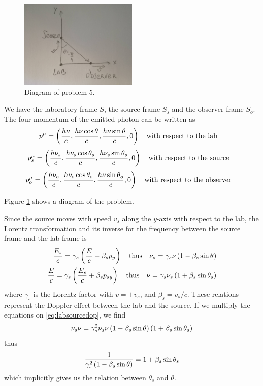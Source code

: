 \documentclass[oneside, 10pt, notitlepage]{book}
\begin{document}
\begin{figure}[H]
    \label{fig:L13_5}
    \centering
    \includegraphics[width=0.5\textwidth]{L13_5}
    \caption{Diagram of problem 5.}
\end{figure}  

We have the laboratory frame \(S\), the source frame \(S_s\) and the observer frame \(S_o\). The four-momentum of the emitted photon can be written as 
\begin{equation}
    p^{\mu} = \lr{\frac{h \nu}{c},\frac{h \nu\cos\theta}{c}, \frac{h \nu\sin\theta}{c},0 } \qq{with respect to the lab}
\end{equation}
\begin{equation}
    p_s^{\mu} = \lr{\frac{h \nu_s}{c},\frac{h \nu_s\cos\theta_s}{c}, \frac{h \nu_s\sin\theta_s}{c},0 }  \qq{with respect to the source}
\end{equation}
\begin{equation}
    p_o^{\mu} = \lr{\frac{h \nu_o}{c},\frac{h \nu_o\cos\theta_o}{c}, \frac{h \nu\sin\theta_o}{c},0 }  \qq{with respect to the observer}
\end{equation}

Figure \ref{fig:L13_5} shows a diagram of the problem.

Since the source moves with speed \(v_s\) along the \(y\)-axis with respect to the lab, the Lorentz transformation and its inverse for the frequency between the source frame and the lab frame is
\begin{equation}\label{eq:labsourcedop}
\begin{split}
    \frac{E_s}{c} = \gamma_s \lr{\frac{E}{c}-\beta_s p_y} \qq{thus} \nu_s = \gamma_s \nu \lr{1-\beta_s \sin \theta} \\
    \frac{E}{c} = \gamma_s \lr{\frac{E_s}{c}+\beta_s p_{sy}} \qq{thus} \nu = \gamma_s \nu_s \lr{1+\beta_s \sin \theta_s}
\end{split}
\end{equation}
where \(\gamma_s\) is the Lorentz factor with \(v = \pm v_s\), and \(\beta_s = v_s/c\). These relations represent the Doppler effect between the lab and the source. If we multiply the equations on \eqref{eq:labsourcedop}, we find
\begin{equation}
    \nu_s \nu = \gamma_s^2 \nu_s \nu \left(1-\beta_s \sin\theta\right)\left(1+\beta_s\sin\theta_s\right)
\end{equation}
thus
\begin{equation}\label{eq:thetalabsource}
    \frac{1}{\gamma_s^2\left(1-\beta_s \sin\theta\right)} = 1+\beta_s\sin\theta_s
\end{equation}
which implicitly gives us the relation between \(\theta_s\) and \(\theta\).
\end{document}
